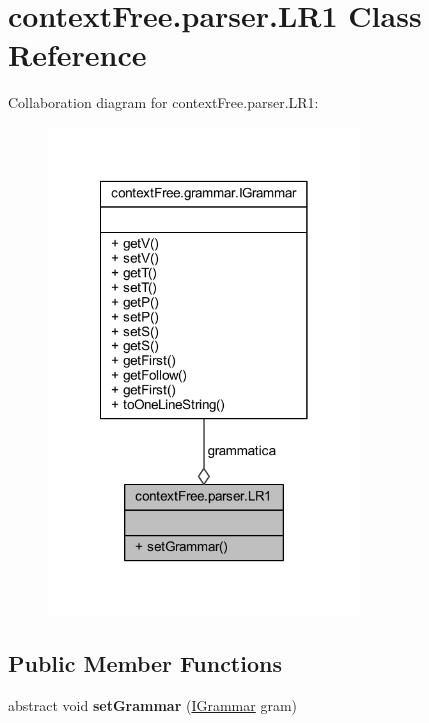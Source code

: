 \hypertarget{classcontext_free_1_1parser_1_1_l_r1}{\section{context\-Free.\-parser.\-L\-R1 Class Reference}
\label{classcontext_free_1_1parser_1_1_l_r1}
}


Collaboration diagram for context\-Free.\-parser.\-L\-R1\-:\nopagebreak
\begin{figure}[H]
\begin{center}
\leavevmode
\includegraphics[width=234pt]{classcontext_free_1_1parser_1_1_l_r1__coll__graph}
\end{center}
\end{figure}
\subsection*{Public Member Functions}
\begin{DoxyCompactItemize}
\item 
\hypertarget{classcontext_free_1_1parser_1_1_l_r1_a464d377de8e3484383068a547208dab5}{abstract void {\bfseries set\-Grammar} (\hyperlink{interfacecontext_free_1_1grammar_1_1_i_grammar}{I\-Grammar} gram)}\label{classcontext_free_1_1parser_1_1_l_r1_a464d377de8e3484383068a547208dab5}

\end{DoxyCompactItemize}
